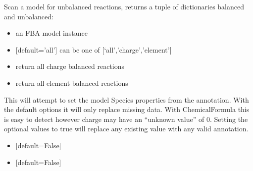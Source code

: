 \documentclass[letterpaper,10pt,english]{sphinxmanual}
\begin{document}
\begin{fulllineitems}
\label{\detokenize{modules_doc:cbmpy.CBTools.scanForUnbalancedReactions}}
\pysigstartsignatures
{}
\pysigstopsignatures
\sphinxAtStartPar
Scan a model for unbalanced reactions, returns a tuple of dictionaries balanced and unbalanced:
\begin{itemize}
\item {} 
\sphinxAtStartPar
{} an FBA model instance

\item {} 
\sphinxAtStartPar
{} {[}default=’all’{]} can be one of {[}‘all’,’charge’,’element’{]}

\item {} 
\sphinxAtStartPar
{} return all charge  balanced reactions

\item {} 
\sphinxAtStartPar
{} return all element  balanced reactions

\end{itemize}

\end{fulllineitems}


\begin{fulllineitems}
\label{\detokenize{modules_doc:cbmpy.CBTools.setSpeciesPropertiesFromAnnotations}}
\pysigstartsignatures
{}
\pysigstopsignatures
\sphinxAtStartPar
This will attempt to set the model Species properties from the annotation. With the default options
it will only replace missing data. With ChemicalFormula this is easy to detect however charge may
have an “unknown value” of 0. Setting the optional values to true will replace any existing value
with any valid annotation.
\begin{itemize}
\item {} 
\sphinxAtStartPar
{} {[}default=False{]}

\item {} 
\sphinxAtStartPar
{} {[}default=False{]}

\end{itemize}

\end{fulllineitems}
\end{document}
